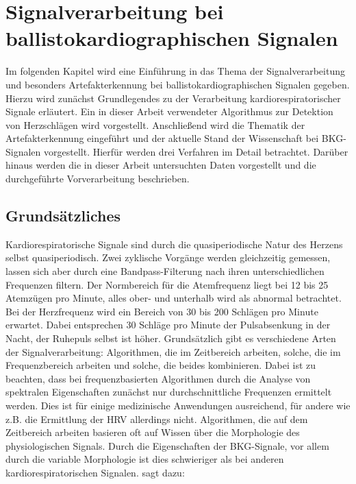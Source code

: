 \chapter{Signalverarbeitung bei ballistokardiographischen Signalen}

Im folgenden Kapitel wird eine Einführung in das Thema der Signalverarbeitung und besonders Artefakterkennung bei ballistokardiographischen Signalen gegeben. Hierzu wird zunächst Grundlegendes zu der Verarbeitung kardiorespiratorischer Signale erläutert. Ein in dieser Arbeit verwendeter Algorithmus zur Detektion von Herzschlägen wird vorgestellt. Anschließend wird die Thematik der Artefakterkennung eingeführt und der aktuelle Stand der Wissenschaft bei \ac{BKG}-Signalen vorgestellt. Hierfür werden drei Verfahren im Detail betrachtet. Darüber hinaus werden die in dieser Arbeit untersuchten Daten vorgestellt und die durchgeführte Vorverarbeitung beschrieben.

\section{Grundsätzliches} %

	Kardiorespiratorische Signale sind durch die quasiperiodische Natur des Herzens selbst quasiperiodisch. Zwei zyklische Vorgänge werden gleichzeitig gemessen, lassen sich aber durch eine Bandpass-Filterung nach ihren unterschiedlichen Frequenzen filtern. Der Normbereich für die Atemfrequenz liegt bei 12 bis 25 Atemzügen pro Minute, alles ober- und unterhalb wird als abnormal betrachtet. Bei der Herzfrequenz wird ein Bereich von 30 bis 200 Schlägen pro Minute erwartet. Dabei entsprechen 30 Schläge pro Minute der Pulsabsenkung in der Nacht, der Ruhepuls selbst ist höher. Grundsätzlich gibt es verschiedene Arten der Signalverarbeitung: Algorithmen, die im Zeitbereich arbeiten, solche, die im Frequenzbereich arbeiten und solche, die beides kombinieren. Dabei ist zu beachten, dass bei frequenzbasierten Algorithmen durch die Analyse von spektralen Eigenschaften zunächst nur durchschnittliche Frequenzen ermittelt werden. Dies ist für einige medizinische Anwendungen ausreichend, für andere wie z.B. die Ermittlung der \ac{HRV} allerdings nicht. Algorithmen, die auf dem Zeitbereich arbeiten basieren oft auf Wissen über die Morphologie des physiologischen Signals. Durch die Eigenschaften der \ac{BKG}-Signale, vor allem durch die variable Morphologie ist dies schwieriger als bei anderen kardiorespiratorischen Signalen. \citeauthor{Paalasmaa2015} sagt dazu:

